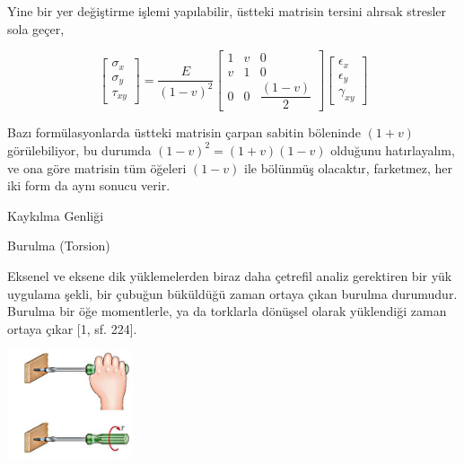\documentclass[12pt,fleqn]{article}\usepackage{../../common}
\begin{document}
Yine bir yer değiştirme işlemi yapılabilir, üstteki matrisin tersini alırsak
stresler sola geçer, 

$$
\left[\begin{array}{c}
\sigma_x \\ \sigma_y \\ \tau_{xy}
\end{array}\right] = 
\frac{E}{(1-v)^2}
\left[\begin{array}{ccc}
1 & v & 0 \\ v & 1 & 0 \\ 0 & 0 & \dfrac{(1-v)}{2}
\end{array}\right]
\left[\begin{array}{c}
\epsilon_{x} \\ \epsilon_{y} \\ \gamma_{xy}
\end{array}\right] 
$$

Bazı formülasyonlarda üstteki matrisin çarpan sabitin böleninde $(1+v)$
görülebiliyor, bu durumda $(1-v)^2=(1+v)(1-v)$ olduğunu hatırlayalım, ve ona
göre matrisin tüm öğeleri $(1-v)$ ile bölünmüş olacaktır, farketmez, her iki
form da aynı sonucu verir.

Kaykılma Genliği




























Burulma (Torsion)

Eksenel ve eksene dik yüklemelerden biraz daha çetrefil analiz gerektiren bir
yük uygulama şekli, bir çubuğun büküldüğü zaman ortaya çıkan burulma durumudur.
Burulma bir öğe momentlerle, ya da torklarla dönüşsel olarak yüklendiği zaman
ortaya çıkar [1, sf. 224].

\includegraphics[width=10em]{phy_020_strs_06_01.jpg}
\end{document}
